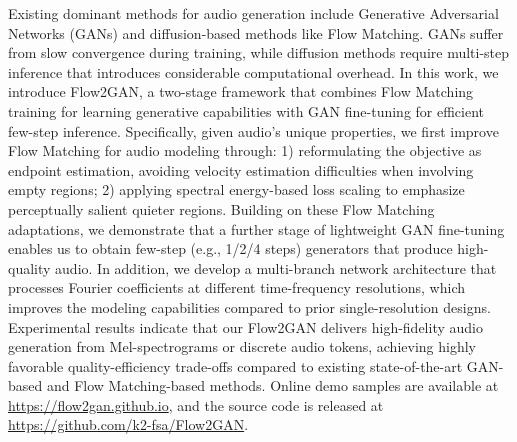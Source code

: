 Existing dominant methods for audio generation include Generative Adversarial Networks (GANs) and diffusion-based methods like Flow Matching. GANs suffer from slow convergence
during training, while diffusion methods require multi-step inference that introduces considerable computational overhead. In this work, we introduce Flow2GAN, a two-stage framework that combines Flow Matching training for learning generative capabilities with GAN fine-tuning for efficient few-step inference. Specifically, given audio's unique properties, we first improve Flow Matching for audio modeling through: 1) reformulating the objective as endpoint estimation, avoiding velocity estimation difficulties when involving empty regions; 2) applying spectral energy-based loss scaling to emphasize perceptually salient quieter regions. 
Building on these Flow Matching adaptations, we demonstrate that a further stage of lightweight GAN fine-tuning enables us to obtain few-step (e.g., 1/2/4 steps) generators that produce high-quality audio. In addition, we develop a multi-branch network architecture that processes Fourier coefficients at different time-frequency resolutions, which improves the modeling capabilities compared to prior single-resolution designs. 
Experimental results indicate that our Flow2GAN delivers high-fidelity audio generation from Mel-spectrograms or discrete audio tokens, achieving highly favorable quality-efficiency trade-offs compared to existing state-of-the-art GAN-based and Flow Matching-based methods.
Online demo samples are available at \url{https://flow2gan.github.io},
and the source code is released at \url{https://github.com/k2-fsa/Flow2GAN}. 

